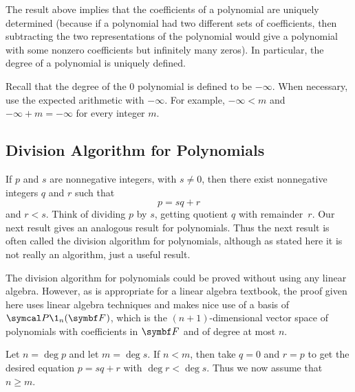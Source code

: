 The result above implies that the coefficients of a polynomial are uniquely determined (because if a polynomial had two different sets of coefficients, then subtracting the two representations of the polynomial would give a polynomial with some nonzero coefficients but infinitely many zeros). In particular, the degree of a polynomial is uniquely defined.


Recall that the degree of the $0$ polynomial is defined to  be $-\infty$. When necessary, use the expected arithmetic
with\/ $-\infty$.  For example,\/ $-\infty < m$ and\/ $-\infty + m = -\infty$ for every integer\/ $m$.

\subsection{Division Algorithm for Polynomials}

If $p$ and $s$ are nonnegative integers, with $s \ne 0$, then there exist
nonnegative integers $q$ and $r$ such that
\[
p = sq + r
\]
and $r < s$.  Think of dividing $p$ by $s$, getting quotient $q$ with
remainder~$r$. Our next result gives an analogous result for polynomials.
Thus the next result is often called the division algorithm for polynomials, although as stated here it is not really an algorithm, just a useful result.


The division algorithm for polynomials could be proved without using any linear algebra. However, as is appropriate for a linear algebra textbook, the proof given here uses linear algebra techniques and makes nice use of a basis of $\P\1_n(\F{})$, which is the $(n+1)$-dimensional vector space of polynomials with coefficients in $\F{}$ and of degree at most $n$.


\proof
Let $n = \deg p$ and let $m = \deg s$. If $n < m$, then take $q = 0$ and $r = p$ to get the desired equation $p = sq + r$ with
$\deg r < \deg s$. Thus we now assume that $n \ge m$.

